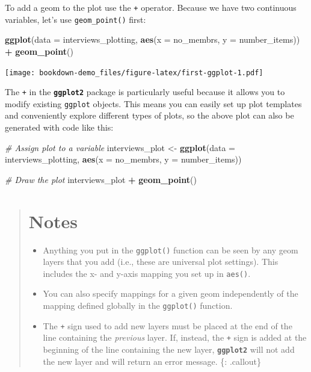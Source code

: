 \documentclass[]{book}
\newenvironment{Shaded}{\begin{snugshade}}{\end{snugshade}}
\newcommand{\KeywordTok}[1]{\textcolor[rgb]{0.13,0.29,0.53}{\textbf{#1}}}
\newcommand{\DataTypeTok}[1]{\textcolor[rgb]{0.13,0.29,0.53}{#1}}
\newcommand{\StringTok}[1]{\textcolor[rgb]{0.31,0.60,0.02}{#1}}
\newcommand{\CommentTok}[1]{\textcolor[rgb]{0.56,0.35,0.01}{\textit{#1}}}
\newcommand{\OperatorTok}[1]{\textcolor[rgb]{0.81,0.36,0.00}{\textbf{#1}}}
\newcommand{\NormalTok}[1]{#1}
\providecommand{\tightlist}{%
  \setlength{\itemsep}{0pt}\setlength{\parskip}{0pt}}
\begin{document}
To add a geom to the plot use the \texttt{+} operator. Because we have
two continuous variables, let's use \texttt{geom\_point()} first:

\begin{Shaded}
\begin{Highlighting}[]
\KeywordTok{ggplot}\NormalTok{(}\DataTypeTok{data =}\NormalTok{ interviews_plotting, }\KeywordTok{aes}\NormalTok{(}\DataTypeTok{x =}\NormalTok{ no_membrs, }\DataTypeTok{y =}\NormalTok{ number_items)) }\OperatorTok{+}
\StringTok{    }\KeywordTok{geom_point}\NormalTok{()}
\end{Highlighting}
\end{Shaded}

\texttt{[image: bookdown-demo\_files/figure-latex/first-ggplot-1.pdf]}

The \texttt{+} in the \textbf{\texttt{ggplot2}} package is particularly
useful because it allows you to modify existing \texttt{ggplot} objects.
This means you can easily set up plot templates and conveniently explore
different types of plots, so the above plot can also be generated with
code like this:

\begin{Shaded}
\begin{Highlighting}[]
\CommentTok{# Assign plot to a variable}
\NormalTok{interviews_plot <-}\StringTok{ }\KeywordTok{ggplot}\NormalTok{(}\DataTypeTok{data =}\NormalTok{ interviews_plotting, }\KeywordTok{aes}\NormalTok{(}\DataTypeTok{x =}\NormalTok{ no_membrs, }\DataTypeTok{y =}\NormalTok{ number_items))}

\CommentTok{# Draw the plot}
\NormalTok{interviews_plot }\OperatorTok{+}
\StringTok{    }\KeywordTok{geom_point}\NormalTok{()}
\end{Highlighting}
\end{Shaded}

\begin{quote}
\section{Notes}\label{notes}

\begin{itemize}
\tightlist
\item
  Anything you put in the \texttt{ggplot()} function can be seen by any
  geom layers that you add (i.e., these are universal plot settings).
  This includes the x- and y-axis mapping you set up in \texttt{aes()}.
\item
  You can also specify mappings for a given geom independently of the
  mapping defined globally in the \texttt{ggplot()} function.
\item
  The \texttt{+} sign used to add new layers must be placed at the end
  of the line containing the \emph{previous} layer. If, instead, the
  \texttt{+} sign is added at the beginning of the line containing the
  new layer, \textbf{\texttt{ggplot2}} will not add the new layer and
  will return an error message. \{: .callout\}
\end{itemize}
\end{quote}
\end{document}
